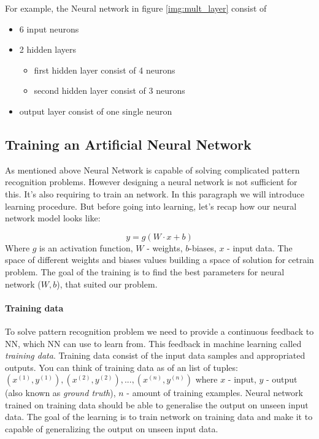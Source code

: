 For example, the Neural network in figure \ref{img:mult_layer} consist of

\begin{itemize}
	\item 6 input neurons
	\item 2 hidden layers
		\begin{itemize}
			\item first hidden layer consist of 4 neurons
			\item second hidden layer consist of 3 neurons
		\end{itemize}
	\item output layer consist of one single neuron
\end{itemize}


\subsection{Training an Artificial Neural Network}
As mentioned above Neural Network is capable of solving complicated
pattern recognition problems. However designing a neural network is not sufficient
for this. It's also requiring to train an network. In this paragraph we will
introduce learning procedure. But before going into learning, let's recap
how our neural network model looks like:

\begin{equation} \label{eq:nn}
	y = g(W \cdot x + b)
\end{equation}
Where $g$ is an activation function, $W$ - weights, $b$-biases, $x$ - input data.
The space of different weights and biases values building a space of solution for
cetrain problem. The goal of the training is to find the best parameters
for neural network ($W, b$), that suited our problem.

\paragraph{Training data} To solve pattern recognition problem we need to provide
a continuous feedback to NN, which NN can use to learn from. This feedback
in machine learning called \emph{training data}.
Training data consist of the input data samples
and appropriated outputs. You can think of training data as of an list of tuples:
${{(x^{(1)}, y^{(1)}), (x^{(2)}, y^{(2)}), ..., (x^{(n)}, y^{(n)})}}$ where $x$ - input,
$y$ - output (also known as \emph{ground truth}), $n$ - amount of training examples. Neural network trained on training data
should be able to generalise the output on unseen input data.
The goal of the learning is to train network on training data and make it to capable of generalizing the output on unseen input data.

